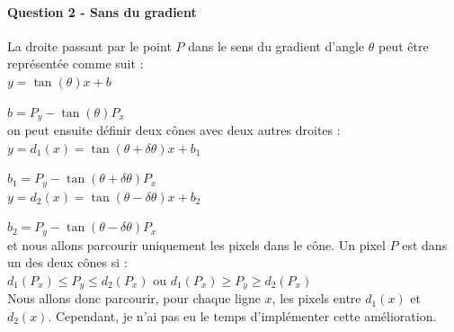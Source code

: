 \documentclass[a4paper,twocolumn]{article}
\begin{document}
\paragraph{Question 2 - Sans du gradient} La droite passant par le point $P$ dans le sens du gradient d'angle $\theta$ peut être représentée comme suit :
\\

$y = \tan(\theta) x + b$

$b = P_y - \tan(\theta) P_x$
\\

on peut ensuite définir deux cônes avec deux autres droites :
\\

$y = d_1(x) = \tan(\theta + \delta \theta) x + b_1$

$b_1 = P_y - \tan(\theta + \delta \theta) P_x$
\\

$y = d_2(x) = \tan(\theta - \delta \theta) x + b_2$

$b_2 = P_y - \tan(\theta - \delta \theta) P_x$
\\

et nous allons parcourir uniquement les pixels dans le cône. Un pixel $P$ est dans un des deux cônes si :
\\

$d_1(P_x) \le P_y \le d_2(P_x)$ ou $d_1(P_x) \ge P_y \ge d_2(P_x)$
\\

Nous allons donc parcourir, pour chaque ligne $x$, les pixels entre $d_1(x)$ et $d_2(x)$. Cependant, je n'ai pas eu le temps d'implémenter cette amélioration.
\end{document}
